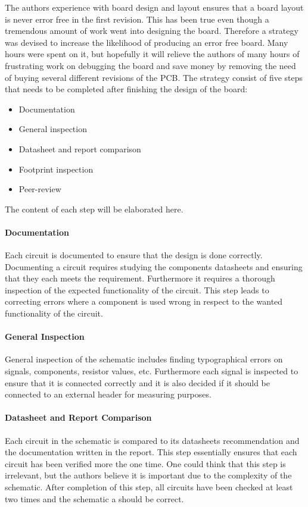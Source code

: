 The authors experience with board design and layout ensures that a board layout is never error free in the first revision. 
This has been true even though a tremendous amount of work went into designing the board.
Therefore a strategy was devised to increase the likelihood of producing an error free board.
Many hours were spent on it, but hopefully it will relieve the authors of many hours of frustrating work on debugging the board and save money by removing the need of buying several different revisions of the PCB. 
The strategy consist of five steps that needs to be completed after finishing the design of the board:

\begin{itemize}
	\item Documentation
	\item General inspection
	\item Datasheet and report comparison
	\item Footprint inspection 
	\item Peer-review
\end{itemize}

The content of each step will be elaborated here. 

\paragraph{Documentation}
Each circuit is documented to ensure that the design is done correctly.
Documenting a circuit requires studying the components datasheets and ensuring that they each meets the requirement.
Furthermore it requires a thorough inspection of the expected functionality of the circuit.
This step leads to correcting errors where a component is used wrong in respect to the wanted functionality of the circuit.

\paragraph{General Inspection}
General inspection of the schematic includes finding typographical errors on signals, components, resistor values, etc.
Furthermore each signal is inspected to ensure that it is connected correctly and it is also decided if it should be connected to an external header for measuring purposes.

\paragraph{Datasheet and Report Comparison}
Each circuit in the schematic is compared to its datasheets recommendation and the documentation written in the report. 
This step essentially ensures that each circuit has been verified more the one time. 
One could think that this step is irrelevant, but the authors believe it is important due to the complexity of the schematic.
After completion of this step, all circuits have been checked at least two times and the schematic a should be correct. 

